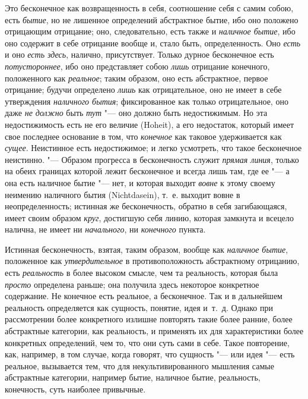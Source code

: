 Это бесконечное как возвращенность в себя, соотношение себя с самим собою,
есть {\em бытие}, но не лишенное определений
абстрактное бытие, ибо оно положено отрицающим отрицание; оно,
следовательно, есть также и {\em наличное бытие}, ибо
оно содержит в себе отрицание вообще и, стало быть, определенность. Оно
{\em есть} и оно {\em есть здесь},
налично, присутствует. Только дурное бесконечное есть
{\em потустороннее}, ибо оно представляет собою
{\em лишь} отрицание конечного, положенного как
{\em реальное}; таким образом, оно есть абстрактное,
первое отрицание; будучи определено {\em лишь} как
отрицательное, оно не имеет в себе утверждения
{\em наличного бытия}; фиксированное как только
отрицательное, оно даже {\em не должно} быть
{\em тут} "--- оно должно быть недостижимым. Но эта
недостижимость есть не его величие (Hoheit), а его недостаток, который
имеет свое последнее основание в том, что
{\em конечное} как таковое удерживается как
{\em сущее}. Неистинное есть недостижимое; и легко
усмотреть, что такое бесконечное неистинно. "--- Образом прогресса в
бесконечность служит {\em прямая линия}, только на
обеих границах которой лежит бесконечное и всегда лишь там, где ее "--- а она
есть наличное бытие "--- нет, и которая выходит
{\em вовне} к этому своему неимению наличного бытия
(Nicht\-dasein), т.~е. выходит вовне в неопределенность; истинная же
бесконечность, обратно в себя загибающаяся, имеет своим образом
{\em круг}, достигшую себя линию, которая замкнута и
всецело налична, не имеет ни {\em начального}, ни {\em конечного} пункта.

Истинная бесконечность, взятая, таким образом, вообще как
{\em наличное бытие}, положенное как
{\em утвердительное} в противоположность абстрактному
отрицанию, есть {\em реальность} в более высоком
смысле, чем та реальность, которая была {\em просто}
определена раньше; она получила здесь некоторое конкретное содержание. Не
конечное есть реальное, а бесконечное. Так и в дальнейшем реальность
определяется как сущность, понятие, идея и~т.~д. Однако при рассмотрении
более конкретного излишне повторять такие более ранние, более абстрактные
категории, как реальность, и применять их для характеристики более
конкретных определений, чем то, что они суть сами в себе. Такое повторение,
как, например, в том случае, когда говорят,
что сущность "--- или идея "--- есть
реальное, вызывается тем, что для некультивированного мышления самые
абстрактные категории, например бытие, наличное бытие, реальность,
конечность, суть наиболее привычные.

